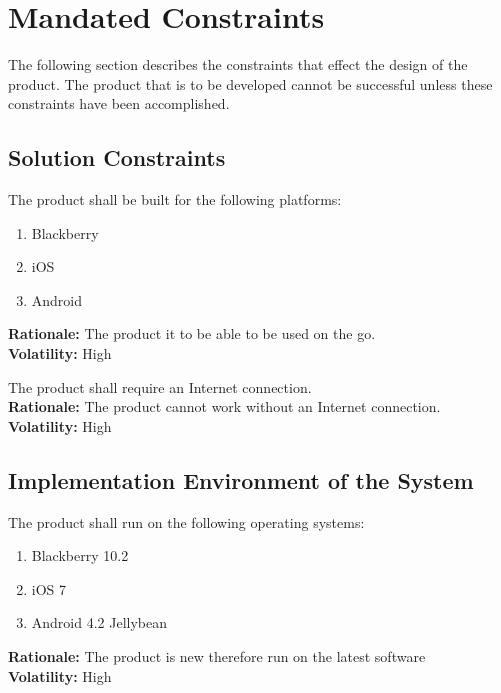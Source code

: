 \newpage
\section{Mandated Constraints}

The following section describes the constraints that effect the design of the
product. The product that is to be developed cannot be successful unless these
constraints have been accomplished.

\subsection{Solution Constraints}

\noindent\llap{\textbf{[R1/1]}}The product shall be built for the following platforms:\\
\begin{enumerate}
		\item Blackberry
		\item iOS 
		\item Android
\end{enumerate}

\textbf{Rationale:}  The product it to be able to be used on the go.\\
\textbf{Volatility:} High


\noindent\llap{\textbf{[R2/1]}}The product shall require an Internet connection. \\

\textbf{Rationale:}  The product cannot work without an Internet connection.\\
\textbf{Volatility:} High

\subsection{Implementation Environment of the System}

\noindent\llap{\textbf{[R3/1]}}The product shall run on the following operating systems:\\

\begin{enumerate}
		\item Blackberry 10.2
		\item iOS 7
		\item Android 4.2 Jellybean
\end{enumerate}

\textbf{Rationale:}  The product is new therefore run on the latest software\\
\textbf{Volatility:} High

